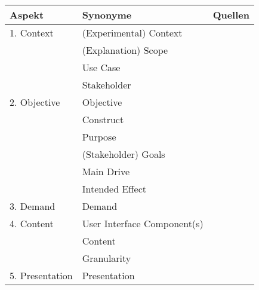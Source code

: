 \begin{table}
    \begin{tabular}{|p{}|p{}|p{}|}
        \hline
        \textbf{Aspekt}          & \textbf{Synonyme} & \textbf{Quellen} \\ \hline
        1. Context         & (Experimental) Context & \cite{chazette_knowledge_nodate} \cite{chazette_end-users_nodate} \cite{sato_context_nodate} \cite{waa_evaluating_2021} \cite{kohl_explainability_2019} \cite{neerincx_using_2018} \cite{sovrano_modelling_2020} \cite{doshi2017towards} \\
                        & (Explanation) Scope & \cite{wohlin2012experimentation} \cite{eiband_impact_2019} \cite{doshi2017towards} \\
                        & Use Case & \cite{waa_evaluating_2021} \\
                        & Stakeholder & \cite{rosenfeld_explainability_2019} \\
        \hline
        2. Objective       & Objective & \cite{nunes_systematic_2017} \\
                        & Construct & \cite{waa_evaluating_2021} \\
                        & Purpose & \cite{nunes_systematic_2017} \cite{wohlin2012experimentation} \\
                        & (Stakeholder) Goals & \cite{cirqueira_scenario-based_2020} \cite{sovrano_modelling_2020} \cite{ribera2019can} \\
                        & Main Drive & \cite{anjomshoae2019explainable} \\
                        & Intended Effect & \cite{balog_measuring_2020} \\
        \hline
        3. Demand          & Demand            & \cite{chazette_knowledge_nodate} \\
        \hline
        4. Content         & User Interface Component(s) & \cite{nunes_systematic_2017}
                                                        \cite{rosenfeld_explainability_2019} \\
                        & Content               & \cite{ribera2019can} \\
                        & Granularity           & \cite{chazette_knowledge_nodate}
                                                  \cite{kohl_explainability_2019} \\
        \hline
        5. Presentation    & Presentation          & \cite{rosenfeld_explainability_2019,kouki_user_2017} \\

\end{tabular}
\end{table}
